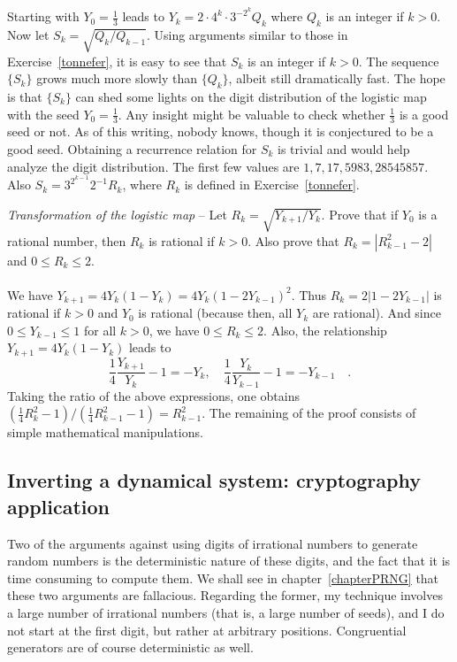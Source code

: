 \documentclass[oneside,10pt]{book}
\newcommand{\qed}{\nobreak \ifvmode \relax \else
      \ifdim\lastskip<1.5em \hskip-\lastskip
      \hskip1.5em plus0em minus0.5em \fi \nobreak
      \vrule height0.75em width0.5em depth0.25em\fi}
\begin{document}
Starting with $Y_0=\frac{1}{3}$ leads to $Y_k = 2\cdot 4^k \cdot 3^{-2^k} Q_k$ where $Q_k$ is an integer if
 $k>0$. Now let $S_k = \sqrt{Q_k/Q_{k-1}}$. Using arguments similar to those in Exercise~\ref{tonnefer}, it is easy to see
 that $S_k$ is an integer if $k>0$. The sequence $\{S_k\}$ grows much more slowly than $\{Q_k\}$, albeit still dramatically fast. 
  The hope is that $\{S_k\}$ can shed some lights on the digit distribution of the logistic map with the seed $Y_0=\frac{1}{3}$. Any insight 
 might be valuable to check whether $\frac{1}{3}$ is a \textcolor{index}{good seed} or not. As of this writing, nobody knows, though it is
 conjectured to be a good seed. Obtaining a recurrence relation for $S_k$ is trivial and would help analyze the digit distribution.
  The first few values are $1, 7, 17, 5983, 28545857$. Also $S_k = 3^{2^{k-1}} 2^{-1}R_k$, where
 $R_k$ is defined in Exercise~\ref{tonnefer}.
\begin{Exercise} \label{tonnefer} {\em Transformation of the logistic map} -- Let $R_k = \sqrt{Y_{k+1}/Y_k}$. Prove that if $Y_0$ is a rational number,
  then $R_k$ is rational if $k>0$. Also prove that $R_k = |R_{k-1}^2 - 2|$ and $0\leq R_k\leq 2$.\vspace{1ex} \\
 \\
\noindent We have $Y_{k+1}=4Y_k(1-Y_k) = 4Y_k(1-2Y_{k-1})^2$. Thus $R_k = 2|1-2Y_{k-1}|$ is rational if $k>0$ and
 $Y_0$ is rational (because then, all $Y_k$ are rational). And since $0\leq Y_{k-1}\leq 1$ for all $k>0$, we have $0\leq R_k\leq 2$.
Also, the relationship $Y_{k+1}=4Y_k(1-Y_k)$ leads to 
$$
\frac{1}{4}\frac{Y_{k+1}}{Y_k} - 1 = -Y_k, \quad \frac{1}{4}\frac{Y_{k}}{Y_{k-1}} - 1 = -Y_{k-1}\quad .
$$
Taking the ratio of the above expressions, one obtains 
$ (\frac{1}{4} R_k^2-1) / (\frac{1}{4} R_{k-1}^2-1) = R_{k-1}^2$.  The remaining of the proof consists of simple mathematical manipulations.\qed
\end{Exercise}




\subsection{Inverting a dynamical system: cryptography application}

Two of the arguments against using digits of irrational numbers to generate random numbers is the deterministic nature of 
 these digits, and the fact that it is time consuming to compute them. We shall see in chapter~\ref{chapterPRNG} that these two arguments
 are fallacious. Regarding the former, my technique involves a large number of irrational numbers (that is, a large number of seeds),
  and I do not start at the first digit, but rather at arbitrary positions. Congruential generators are of course
 deterministic as well. 
\end{document}
